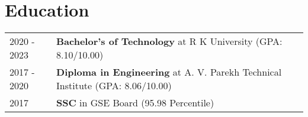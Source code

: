 \documentclass[a4paper,12pt]{article}
\begin{document}
\section{Education}
\begin{tabularx}{\linewidth}{@{}l X@{}}	
2020 - 2023 & \textbf{Bachelor's of Technology} at R K University \hfill \normalsize (GPA: 8.10/10.00) \\

2017 - 2020 & \textbf{Diploma in Engineering} at A. V. Parekh Technical Institute \hfill (GPA: 8.06/10.00) \\ 

2017 & \textbf{SSC} in GSE Board \hfill  (95.98 Percentile) \\

\end{tabularx}
\end{document}
